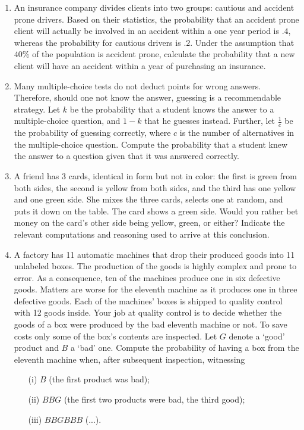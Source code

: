 \documentclass{article}
\begin{document}
\begin{enumerate}
	\item An insurance company divides clients into two groups: cautious and accident prone drivers. Based on their statistics, the probability that an accident prone client will actually be involved in an accident within a one year period is $.4$, whereas the probability for cautious drivers is $.2$. Under the assumption that $40\%$ of the population is accident prone, calculate the probability that a new client will have an accident within a year of purchasing an insurance.
	\item Many multiple-choice tests do not deduct points for wrong answers. Therefore, should one not know the answer, guessing is a recommendable strategy. Let $k$ be the probability that a student knows the answer to a multiple-choice question, and $1-k$ that he guesses instead. Further, let $\frac{1}{c}$ be the probability of guessing correctly, where $c$ is the number of alternatives in the multiple-choice question. Compute the probability that a student knew the answer to a question given that it was answered correctly.
	\item A friend has 3 cards, identical in form but not in color: the first is green from both sides, the second is yellow from both sides, and the third has one yellow and one green side. She mixes the three cards, selects one at random, and puts it down on the table. The card shows a green side. Would you rather bet money on the card's other side being yellow, green, or either? Indicate the relevant computations and reasoning used to arrive at this conclusion.
	\item A factory has 11 automatic machines that drop their produced goods into 11 unlabeled boxes. The production of the goods is highly complex and prone to error. As a consequence, ten of the machines produce one in six defective goods. Matters are worse for the eleventh machine as it produces one in three defective goods. Each of the machines' boxes is shipped to quality control with 12 goods inside. Your job at quality control is to decide whether the goods of a box were produced by the bad eleventh machine or not. To save costs only some of the box's contents are inspected. Let $G$ denote a `good' product and $B$ a `bad' one. Compute the probability of having a box from the eleventh machine when, after subsequent inspection, witnessing
		\begin{itemize}
			\item[(i)] $B$ (the first product was bad);
			\item[(ii)] $BBG$ (the first two products were bad, the third good);
			\item[(iii)] $BBGBBB$ (...).
		\end{itemize}
      
\end{enumerate}		
\end{document}
